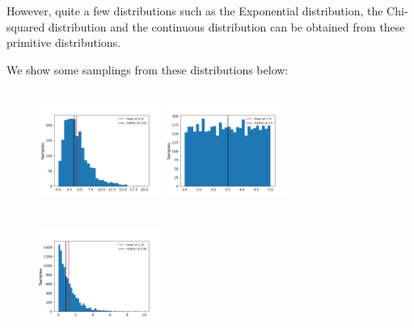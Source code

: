 \documentclass[a4paper,11pt]{article}
\theoremstyle{mytheor}
\begin{document}
    However, quite a few distributions such as the Exponential distribution, the Chi-squared distribution and the continuous distribution can be obtained from these primitive distributions. 
    
    We show some samplings from these distributions below:
    
    \begin{figure}[H]
    \centering
    \begin{minipage}{.33\textwidth}
      \centering
      \includegraphics[width=4cm, height=4cm]{sampling/chi2_samplesc.png}
    \end{minipage}%
    \begin{minipage}{.33\textwidth}
      \centering
      \includegraphics[width=4cm, height=4cm]{sampling/cont_samplesc.png}
    \end{minipage}%
    \begin{minipage}{.33\textwidth}
      \centering
      \includegraphics[width=4cm, height=4cm]{sampling/exp_samplesc.png}
    \end{minipage}%
    \par
    \medskip
    \noindent
    \begin{minipage}[t]{.32\textwidth}
      \centering
    \end{minipage}%
    \begin{minipage}[t]{.32\textwidth}
      \centering
    \end{minipage}
    \begin{minipage}[t]{.32\textwidth}
      \centering
    \end{minipage}%
    \end{figure}
    
\end{document}
